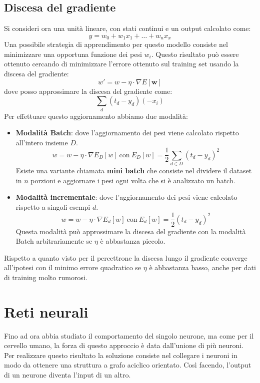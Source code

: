 \subsection{Discesa del gradiente}
Si consideri ora una unità lineare, con stati continui e un output calcolato come:
\begin{equation}
    y = w_0 + w_1x_1 + \dots + w_nx_x
\end{equation}
Una possibile strategia di apprendimento per questo modello consiste nel minimizzare una opportuna funzione dei pesi $w_i$. Questo risultato può essere ottenuto cercando di minimizzare l'errore ottenuto sul training set usando la discesa del gradiente:
\begin{equation}
    w' = w - \eta \cdot \nabla E[\textbf{w}]
\end{equation}
dove posso approssimare la discesa del gradiente come:
\begin{equation}
    \sum_d (t_d - y_d) (- x_i)
\end{equation}
Per effettuare questo aggiornamento abbiamo due modalità:
\begin{itemize}
    \item \textbf{Modalità Batch}: dove l'aggiornamento dei pesi viene calcolato rispetto all'intero insieme $D$.
    \begin{equation}
        w = w - \eta \cdot \nabla E_D[w] \ \text{con} \ E_D[w] = \frac{1}{2} \sum_{d \in D} (t_d - y_d)^2
    \end{equation}
    Esiste una variante chiamata \textbf{mini batch} che consiste nel dividere il dataset in $n$ porzioni e aggiornare i pesi ogni volta che si è analizzato un batch.
    \item \textbf{Modalità incrementale}: dove l'aggiornamento dei pesi viene calcolato rispetto a singoli esempi $d$.
    \begin{equation}
        w = w - \eta \cdot \nabla E_d[w] \ \text{con} \ E_d[w] = \frac{1}{2} (t_d - y_d)^2
    \end{equation}
    Questa modalità può approssimare la discesa del gradiente con la modalità Batch arbitrariamente se $\eta$ è abbastanza piccolo.
\end{itemize}

Rispetto a quanto visto per il percettrone la discesa lungo il gradiente converge all'ipotesi con il minimo errore quadratico se $\eta$ è abbastanza basso, anche per dati di training molto rumorosi.
\section{Reti neurali}
Fino ad ora abbia studiato il comportamento del singolo neurone, ma come per il cervello umano, la forza di questo approccio è data dall'unione di più neuroni. Per realizzare questo risultato la soluzione consiste nel collegare i neuroni in modo da ottenere una struttura a grafo aciclico orientato. Così facendo, l'output di un neurone diventa l'input di un altro.

